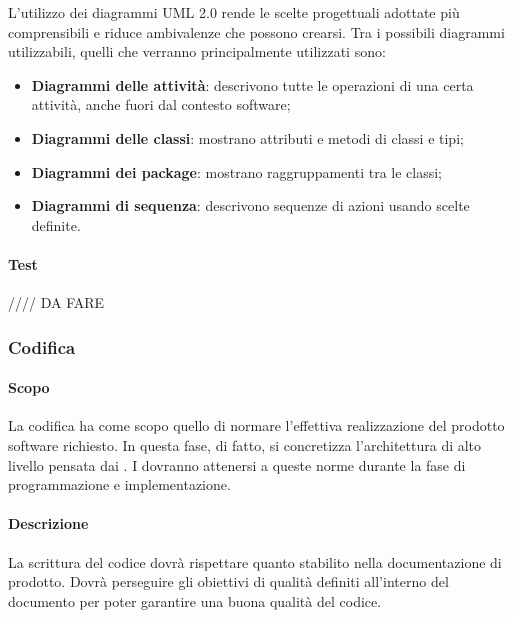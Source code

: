 L'utilizzo dei diagrammi UML 2.0 rende le scelte progettuali adottate più comprensibili e riduce ambivalenze che possono crearsi. Tra i possibili diagrammi utilizzabili, quelli che verranno principalmente utilizzati sono:
\begin{itemize}

\item \textbf{Diagrammi delle attività}: descrivono tutte le operazioni di una certa attività,  anche fuori dal contesto software;

\item \textbf{Diagrammi delle classi}: mostrano attributi e metodi di classi e tipi;

\item \textbf{Diagrammi dei package}: mostrano raggruppamenti tra le classi;

\item \textbf{Diagrammi di sequenza}: descrivono sequenze di azioni usando scelte definite.

\end{itemize}

\paragraph{Test}

//// DA FARE


\subsubsection{Codifica}

\paragraph{Scopo}

La codifica ha come scopo quello di normare l'effettiva realizzazione del prodotto software richiesto. In questa fase, di fatto, si concretizza l'architettura di alto livello pensata dai \progs{}. I \progrs{} dovranno attenersi a queste norme durante la fase di programmazione e implementazione.

\paragraph{Descrizione}

La scrittura del codice dovrà rispettare quanto stabilito nella documentazione di prodotto. Dovrà perseguire gli obiettivi di qualità definiti all'interno del documento \PdQ{} per poter garantire una buona qualità del codice.


